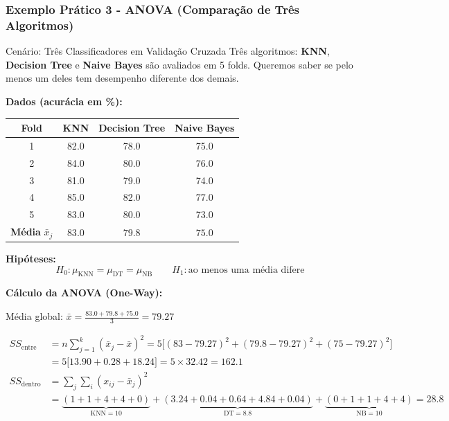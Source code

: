 \documentclass[12pt,a4paper]{article}
\begin{document}
\subsubsection*{Exemplo Prático 3 - ANOVA (Comparação de Três Algoritmos)}

\begin{exemplobox}{Cenário: Três Classificadores em Validação Cruzada}
Três algoritmos: \textbf{KNN}, \textbf{Decision Tree} e \textbf{Naive Bayes} são avaliados em 5 folds. Queremos saber se pelo menos um deles tem desempenho diferente dos demais.
\end{exemplobox}

\textbf{Dados (acurácia em \%):}

\begin{center}
\begin{tabular}{cccc}
\toprule
Fold & KNN & Decision Tree & Naive Bayes \\
\midrule
1 & 82{.}0 & 78{.}0 & 75{.}0 \\
2 & 84{.}0 & 80{.}0 & 76{.}0 \\
3 & 81{.}0 & 79{.}0 & 74{.}0 \\
4 & 85{.}0 & 82{.}0 & 77{.}0 \\
5 & 83{.}0 & 80{.}0 & 73{.}0 \\
\midrule
\textbf{Média} $\bar{x}_j$ & $83{.}0$ & $79{.}8$ & $75{.}0$ \\
\bottomrule
\end{tabular}
\end{center}

\textbf{Hipóteses:}
\[
  H_0: \mu_{\text{KNN}} = \mu_{\text{DT}} = \mu_{\text{NB}}
  \qquad H_1: \text{ao menos uma média difere}
\]

\textbf{Cálculo da ANOVA (One-Way):}

Média global: $\bar{x} = \frac{83{.}0 + 79{.}8 + 75{.}0}{3} = 79{.}27$

\begin{align*}
  SS_{\text{entre}} &= n\sum_{j=1}^{k}(\bar{x}_j - \bar{x})^2
    = 5\bigl[(83{-}79{.}27)^2 + (79{.}8{-}79{.}27)^2 + (75{-}79{.}27)^2\bigr] \\
    &= 5\bigl[13{.}90 + 0{.}28 + 18{.}24\bigr] = 5 \times 32{.}42 = 162{.}1 \\[6pt]
  SS_{\text{dentro}} &= \sum_{j}\sum_{i}(x_{ij} - \bar{x}_j)^2 \\
    &= \underbrace{(1+1+4+4+0)}_{\text{KNN}=10} + \underbrace{(3{.}24+0{.}04+0{.}64+4{.}84+0{.}04)}_{\text{DT}=8{.}8}
       + \underbrace{(0+1+1+4+4)}_{\text{NB}=10} = 28{.}8
\end{align*}
\end{document}
